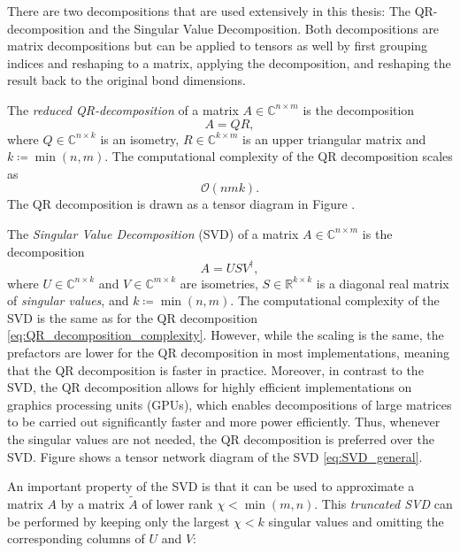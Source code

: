 There are two decompositions that are used extensively in this thesis: The QR-decomposition and the Singular Value Decomposition. Both decompositions are matrix decompositions but can be applied to tensors as well by first grouping indices and reshaping to a matrix, applying the decomposition, and reshaping the result back to the original bond dimensions. \par
The \textit{reduced QR-decomposition} of a matrix $A \in \mathbb{C}^{n\times m}$ is the decomposition
\begin{equation}
	\label{eq:QR_decomposition_general}
	A = QR,
\end{equation}
where $Q\in\mathbb{C}^{n\times k}$ is an isometry, $R\in\mathbb{C}^{k\times m}$ is an upper triangular matrix and $k \coloneqq \min(n, m)$. The computational complexity of the QR decomposition scales as
\begin{equation}
	\label{eq:QR_decomposition_complexity}
	\mathcal{O}\left(nmk\right).
\end{equation}
The QR decomposition is drawn as a tensor diagram in Figure . \par
The \textit{Singular Value Decomposition} (SVD) of a matrix $A \in \mathbb{C}^{n\times m}$ is the decomposition
\begin{equation}
	\label{eq:SVD_general}
	A = USV^\dagger,
\end{equation}
where $U\in\mathbb{C}^{n\times k}$ and $V\in\mathbb{C}^{m\times k}$ are isometries, $S\in\mathbb{R}^{k\times k}$ is a diagonal real matrix of \textit{singular values}, and $k \coloneqq \min(n, m)$. The computational complexity of the SVD is the same as for the QR decomposition \eqref{eq:QR_decomposition_complexity}. However, while the scaling is the same, the prefactors are lower for the QR decomposition in most implementations, meaning that the QR decomposition is faster in practice. Moreover, in contrast to the SVD, the QR decomposition allows for highly efficient implementations on graphics processing units (GPUs), which enables decompositions of large matrices to be carried out significantly faster and more power efficiently. Thus, whenever the singular values are not needed, the QR decomposition is preferred over the SVD. Figure  shows a tensor network diagram of the SVD \eqref{eq:SVD_general}. \par
An important property of the SVD is that it can be used to approximate a matrix $A$ by a matrix $\tilde{A}$ of lower rank $\chi < \min(m, n)$. This \textit{truncated SVD} can be performed by keeping only the largest $\chi < k$ singular values and omitting the corresponding columns of $U$ and $V$:

